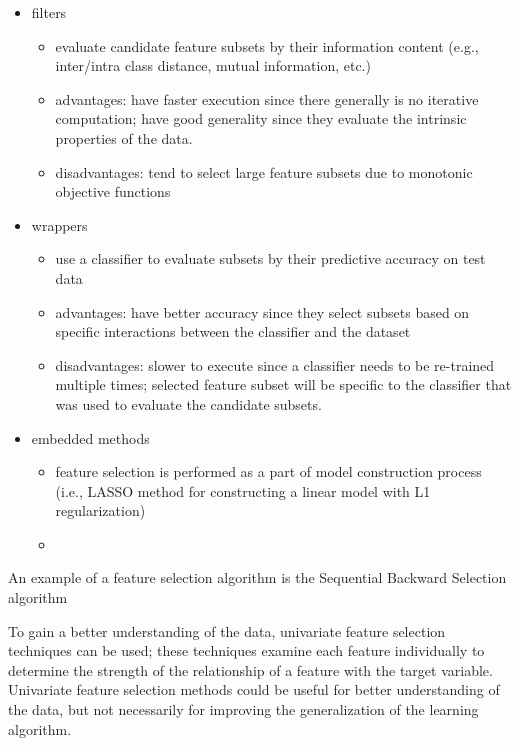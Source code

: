 \begin{itemize}
    \item filters
    \begin{itemize}
        \item evaluate candidate feature subsets by their information content (e.g., inter/intra class distance, mutual information, etc.)
        \item advantages: have faster execution since there generally is no iterative computation;
        have good generality since they evaluate the intrinsic properties of the data.
        \item disadvantages: tend to select large feature subsets due to monotonic objective functions
    \end{itemize}
    \item wrappers
    \begin{itemize}
        \item use a classifier to evaluate subsets by their predictive accuracy on test data
        \item advantages: have better accuracy since they select subsets based on specific interactions between the classifier and the dataset
        \item disadvantages: slower to execute since a classifier needs to be re-trained multiple times;
        selected feature subset will be specific to the classifier that was used to evaluate the candidate subsets.
    \end{itemize}
    \item embedded methods
    \begin{itemize}
        \item feature selection is performed as a part of model construction process (i.e., LASSO method for constructing a linear model with L1 regularization)\cite{Scikit-learndevelopers2019}
        \item
    \end{itemize}
\end{itemize}
An example of a feature selection algorithm is the Sequential Backward Selection algorithm

To gain a better understanding of the data, univariate feature selection techniques can be used;
these techniques examine each feature individually to determine the strength of the relationship of a feature with the target variable.
Univariate feature selection methods could be useful for better understanding of the data, but not necessarily for improving the generalization of the learning algorithm.

